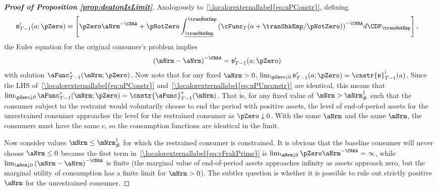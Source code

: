 \documentclass[\econtexRoot/BufferStockTheory]{subfiles}
\begin{document}
\begin{proof}[\textbf{Proof of Proposition \ref{prop:deatonIsLimit}}]
Analogously to~\eqref{\localorexternallabel{eq:uPConstr}}, defining
\begin{equation}\begin{gathered}\begin{aligned}
      \mathfrak{v}_{T-1}^{\prime}(a;\pZero)  & \equiv  \left[\pZero \aNrm^{-\CRRA}+\pNotZero\int_{\underline{\tranShkEmp}}^{\bar{\tranShkEmp}} {\left(\cFunc_{T}(a+\tranShkEmp/\pNotZero)\right)}^{-\CRRA} d\CDF_{\tranShkEmp}\right], \label{eq:vFrakPrime}
    \end{aligned}\end{gathered}\end{equation}
the Euler equation for the original consumer's problem implies
\begin{equation}\begin{gathered}\begin{aligned}
      {(\mNrm-\aNrm)}^{-\CRRA}  & = \mathfrak{v}_{T-1}^{\prime}(a;\pZero) \label{eq:uPUnconstr}
    \end{aligned}\end{gathered}\end{equation}
with solution $\aFunc_{T-1}^{*}(\mNrm;\pZero)$.  Now note that for any fixed $\aNrm>0$, $\lim_{\pZero \downarrow 0} \mathfrak{v}_{T-1}^{\prime}(a;\pZero) = \cnstr{\mathfrak{v}}_{T-1}^{\prime}(a)$.  Since the LHS of~\eqref{\localorexternallabel{eq:uPConstr}} and~\eqref{\localorexternallabel{eq:uPUnconstr}} are identical, this means that $\lim_{\pZero \downarrow 0} \aFunc_{T-1}^{*}(\mNrm;\pZero) = \cnstr{\aFunc}_{T-1}^{*}(\mNrm)$.  That is, for any fixed value of $\mNrm > \mNrm^{1}_{\#}$ such that the consumer subject to the restraint would voluntarily choose to end the period with positive assets, the level of end-of-period assets for the unrestrained consumer approaches the level for the restrained consumer as $\pZero \downarrow 0$.  With the same $\aNrm$ and the same $\mNrm$, the consumers must have the same $c$, so the consumption functions are identical in the limit.

Now consider values $\mNrm\leq \mNrm^{1}_{\#}$ for which the restrained consumer is constrained.  It is obvious that the baseline consumer will never choose $\aNrm \leq 0$ because the first term in~\eqref{\localorexternallabel{eq:vFrakPrime}} is $\lim_{\aNrm \downarrow 0} \pZero \aNrm^{-\CRRA} = \infty$, while $\lim_{\aNrm \downarrow 0} {(\mNrm-\aNrm)}^{-\CRRA}$ is finite (the marginal value of end-of-period assets approaches infinity as assets approach zero, but the marginal utility of consumption has a finite limit for $\mNrm>0$).  The subtler question is whether it is possible to rule out strictly positive $\aNrm$ for the unrestrained consumer.


\end{proof}
\end{document}
